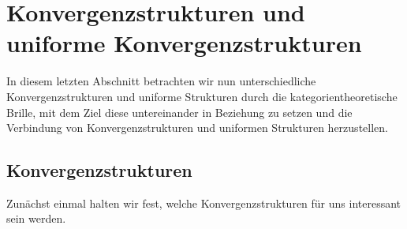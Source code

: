 \section{Konvergenzstrukturen und uniforme Konvergenzstrukturen}

In diesem letzten Abschnitt betrachten wir nun unterschiedliche Konvergenzstrukturen und uniforme Strukturen durch die kategorientheoretische Brille, mit dem Ziel diese untereinander in Beziehung zu setzen und die Verbindung von Konvergenzstrukturen und uniformen Strukturen herzustellen.


\subsection{Konvergenzstrukturen}

Zunächst einmal halten wir fest, welche Konvergenzstrukturen für uns interessant sein werden.

